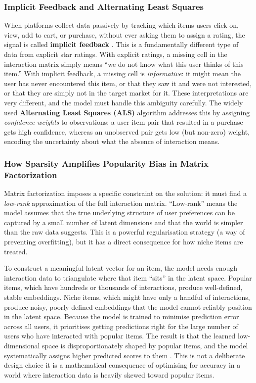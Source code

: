 \documentclass[11pt,a4paper]{report}
\begin{document}
\subsubsection*{Implicit Feedback and Alternating Least Squares}

When platforms collect data passively by tracking which items users click on, view, add to cart, or purchase, without ever asking them to assign a rating, the signal is called \textbf{implicit feedback} \citep{hu2008collaborative}. This is a fundamentally different type of data from explicit star ratings. With explicit ratings, a missing cell in the interaction matrix simply means ``we do not know what this user thinks of this item.'' With implicit feedback, a missing cell is \emph{informative}: it might mean the user has never encountered this item, or that they saw it and were not interested, or that they are simply not in the target market for it. These interpretations are very different, and the model must handle this ambiguity carefully. The widely used \textbf{Alternating Least Squares (ALS)} algorithm \citep{hu2008collaborative, benfred2018implicit} addresses this by assigning \emph{confidence weights} to observations: a user-item pair that resulted in a purchase gets high confidence, whereas an unobserved pair gets low (but non-zero) weight, encoding the uncertainty about what the absence of interaction means.

\subsubsection*{How Sparsity Amplifies Popularity Bias in Matrix Factorization}

Matrix factorization imposes a specific constraint on the solution: it must find a \emph{low-rank} approximation of the full interaction matrix. ``Low-rank'' means the model assumes that the true underlying structure of user preferences can be captured by a small number of latent dimensions and that the world is simpler than the raw data suggests. This is a powerful regularisation strategy (a way of preventing overfitting), but it has a direct consequence for how niche items are treated.

To construct a meaningful latent vector for an item, the model needs enough interaction data to triangulate where that item ``sits'' in the latent space. Popular items, which have hundreds or thousands of interactions, produce well-defined, stable embeddings. Niche items, which might have only a handful of interactions, produce noisy, poorly defined embeddings that the model cannot reliably position in the latent space. Because the model is trained to minimise prediction error across all users, it prioritises getting predictions right for the large number of users who have interacted with popular items. The result is that the learned low-dimensional space is disproportionately shaped by popular items, and the model systematically assigns higher predicted scores to them \citep{steck2011itempopularity}. This is not a deliberate design choice it is a mathematical consequence of optimising for accuracy in a world where interaction data is heavily skewed toward popular items.
\end{document}

